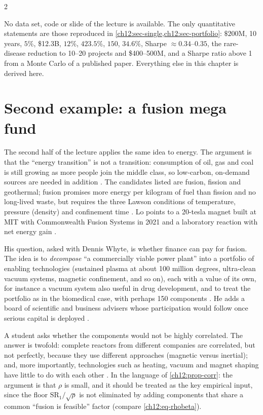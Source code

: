 \begin{paracol}{2}
\begin{coursenote}
No data set, code or slide of the lecture is available. The only quantitative statements are those reproduced in
\cref{ch12:sec-single,ch12:sec-portfolio}: $\$200$M, 10 years, $5\%$, \$12.3B, $12\%$, $423.5\%$, $150$, $34.6\%$, Sharpe
$\approx0.34$--$0.35$, the rare-disease reduction to 10--20 projects and \$400--500M, and a Sharpe ratio above 1 from a
Monte Carlo of a published paper. Everything else in this chapter is derived here.
\end{coursenote}

\section{Second example: a fusion mega fund}\label{ch12:sec-fusion}

The second half of the lecture applies the same idea to energy. The argument is that the ``energy transition''
is not a transition: consumption of oil, gas and coal is still growing as more people join the middle class,
so low-carbon, on-demand sources are needed in addition . The candidates listed are fusion, fission and
geothermal; fusion promises more energy per kilogram of fuel than fission and no long-lived waste, but requires the three
Lawson conditions of temperature, pressure (density) and confinement time . Lo points to
a 20-tesla magnet built at MIT with Commonwealth Fusion Systems in 2021 and a laboratory reaction with net energy
gain .

His question, asked with Dennis Whyte, is whether finance can pay for fusion. The idea is to \emph{decompose} ``a
commercially viable power plant'' into a portfolio of enabling technologies (sustained
plasma at about 100 million degrees, ultra-clean vacuum systems, magnetic confinement, and so on), each with a value of its
own, for instance a vacuum system also useful in drug development, and to treat the portfolio as in the biomedical
case, with perhaps 150 components . He adds a
board of scientific and business advisers whose participation would follow once serious capital is deployed
.

A student asks whether the components would not be highly correlated. The answer is twofold: complete reactors from
different companies are correlated, but not perfectly, because they use different approaches (magnetic versus
inertial); and, more importantly, technologies such as heating, vacuum and magnet shaping have little to do with each
other . In the language of \cref{ch12:prop-corr}: the argument is that
$\rho$ is small, and it should be treated as the key empirical input, since the floor $\mathrm{SR}_1/\sqrt\rho$
is not eliminated by adding components that share a common ``fusion is feasible'' factor (compare \eqref{ch12:eq-rhobeta}).


\end{paracol}
